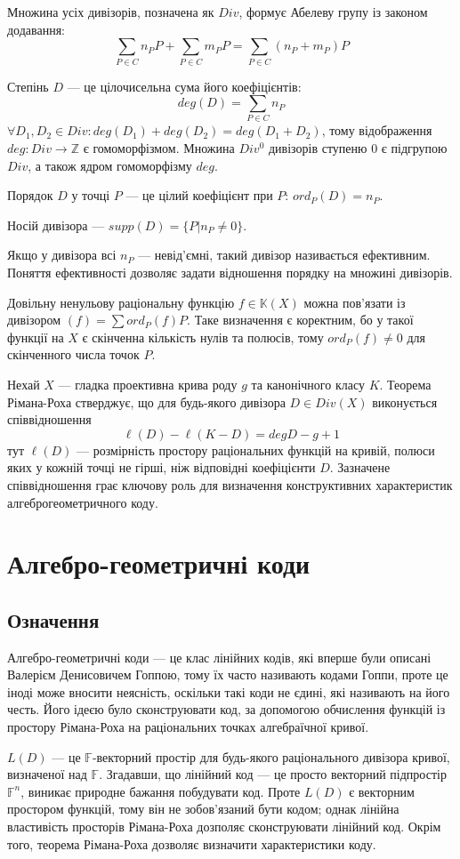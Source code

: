 \documentclass[a4paper,14pt,oneside]{extarticle}
\begin{document}
Множина усіх дивізорів, позначена як $Div$, формує Абелеву групу із законом додавання:
$$
\sum_{P \in C} n_P P + \sum_{P \in C} m_P P = \sum_{P \in C} (n_P + m_P) P
$$

Степінь $D$ --- це цілочисельна сума його коефіцієнтів:
$$deg(D) = \sum_{P \in C} n_P$$
$\forall D_1, D_2 \in Div: deg(D_1) + deg(D_2) = deg(D_1 + D_2)$, тому відображення $deg: Div \to \mathbb{Z}$ є гомоморфізмом.
Множина $Div^0$ дивізорів ступеню 0 є підгрупою $Div$, а також ядром гомоморфізму $deg$.

Порядок $D$ у точці $P$ --- це цілий коефіцієнт при $P$: $ord_P(D) = n_P$.

Носій дивізора --- $supp(D) = \{ P | n_P \neq 0 \}$.

Якщо у дивізора всі $n_P$ --- невід'ємні, такий дивізор називається ефективним. Поняття ефективності дозволяє задати відношення порядку на множині дивізорів. 

Довільну ненульову раціональну функцію $f \in \mathbb{K}(X)$ можна пов'язати із дивізором $(f) = \sum ord_P(f)P$. 
Таке визначення є коректним, бо у такої функції на $X$ є скінченна кількість нулів та полюсів, тому $ord_P(f) \neq 0$ для скінченного числа точок $P$.

Нехай $X$ --- гладка проективна крива роду $g$ та канонічного класу $K$. Теорема Рімана-Роха стверджує, 
що для будь-якого дивізора $D \in Div(X)$ виконується співвідношення
$$\ell(D) - \ell(K-D) = deg D - g +1$$
тут $\ell(D)$ --- розмірність простору раціональних функцій на кривій, полюси яких у кожній точці не гірші, 
ніж відповідні коефіцієнти $D$. Зазначене співвідношення грає ключову роль для визначення конструктивних 
характеристик алгеброгеометричного коду.

\pagebreak
\section{Алгебро-геометричні коди}
\subsection{Означення}
Алгебро-геометричні коди --- це клас лінійних кодів, які вперше були описані Валерієм Денисовичем Гоппою, 
тому їх часто називають кодами Гоппи, проте це іноді може вносити неясність, оскільки такі коди не єдині, які називають на його честь. 
Його ідеєю було сконструювати код, за допомогою обчислення функцій із простору Рімана-Роха на раціональних точках алгебраїчної кривої. 

$L(D)$ --- це $\mathbb{F}$-векторний простір для будь-якого раціонального дивізора кривої, визначеної над $\mathbb{F}$. 
Згадавши, що лінійний код --- це просто векторний підпростір $\mathbb{F}^n$, виникає природне бажання побудувати код. 
Проте $L(D)$ є векторним простором функцій, тому він не зобов'язаний бути кодом; однак лінійна властивість просторів Рімана-Роха дозполяє сконструювати лінійний код. 
Окрім того, теорема Рімана-Роха дозволяє визначити характеристики коду.
\end{document}
